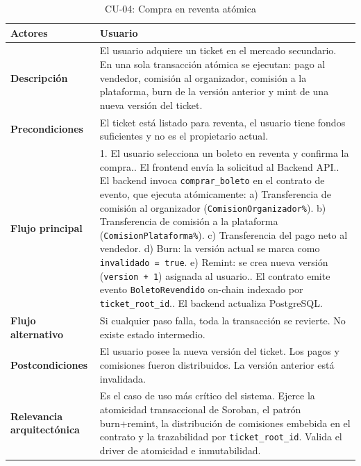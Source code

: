 \documentclass[12pt,oneside]{article}
\begin{document}
\begin{table}[h!]
  \centering
  \begin{tabularx}{\textwidth}{@{}p{3.5cm} X@{}}
    \toprule
    \textbf{Actores} & Usuario\\
    \midrule
    \textbf{Descripción} & El usuario adquiere un ticket en el mercado secundario. En una sola transacción atómica se ejecutan: pago al vendedor, comisión al organizador, comisión a la plataforma, burn de la versión anterior y mint de una nueva versión del ticket.\\
    \midrule
    \textbf{Precondiciones} & El ticket está listado para reventa, el usuario tiene fondos suficientes y no es el propietario actual.\\
    \midrule
    \textbf{Flujo principal} &
      1. El usuario selecciona un boleto en reventa y confirma la compra.\newline
      2. El frontend envía la solicitud al Backend API.\newline
      3. El backend invoca \texttt{comprar\_boleto} en el contrato de evento, que ejecuta atómicamente:\newline
      \hspace{1em}a) Transferencia de comisión al organizador (\texttt{ComisionOrganizador\%}).\newline
      \hspace{1em}b) Transferencia de comisión a la plataforma (\texttt{ComisionPlataforma\%}).\newline
      \hspace{1em}c) Transferencia del pago neto al vendedor.\newline
      \hspace{1em}d) Burn: la versión actual se marca como \texttt{invalidado = true}.\newline
      \hspace{1em}e) Remint: se crea nueva versión (\texttt{version + 1}) asignada al usuario.\newline
      4. El contrato emite evento \texttt{BoletoRevendido} on-chain indexado por \texttt{ticket\_root\_id}.\newline
      5. El backend actualiza PostgreSQL.\\
    \midrule
    \textbf{Flujo alternativo} & Si cualquier paso falla, toda la transacción se revierte. No existe estado intermedio.\\
    \midrule
    \textbf{Postcondiciones} & El usuario posee la nueva versión del ticket. Los pagos y comisiones fueron distribuidos. La versión anterior está invalidada.\\
    \midrule
    \textbf{Relevancia arquitectónica} & Es el caso de uso más crítico del sistema. Ejerce la atomicidad transaccional de Soroban, el patrón burn+remint, la distribución de comisiones embebida en el contrato y la trazabilidad por \texttt{ticket\_root\_id}. Valida el driver de atomicidad e inmutabilidad.\\
    \bottomrule
  \end{tabularx}
  \caption{CU-04: Compra en reventa atómica}
  \label{tab:cu04}
\end{table}
\end{document}
